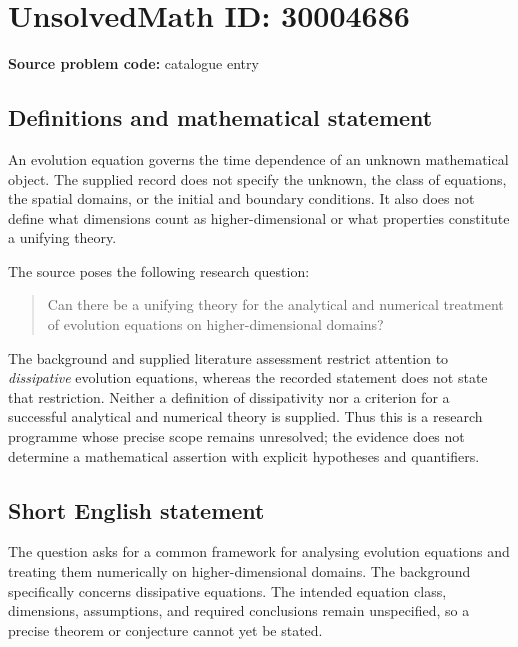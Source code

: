 \documentclass[11pt]{article}
\begin{document}
\section*{UnsolvedMath ID: 30004686}
\textbf{Source problem code:} catalogue entry
\subsection{Definitions and mathematical statement}
An evolution equation governs the time dependence of an unknown mathematical object. The supplied record does not specify the unknown, the class of equations, the spatial domains, or the initial and boundary conditions. It also does not define what dimensions count as higher-dimensional or what properties constitute a unifying theory.

The source poses the following research question:
\begin{quote}
Can there be a unifying theory for the analytical and numerical treatment of evolution equations on higher-dimensional domains?
\end{quote}
The background and supplied literature assessment restrict attention to \emph{dissipative} evolution equations, whereas the recorded statement does not state that restriction. Neither a definition of dissipativity nor a criterion for a successful analytical and numerical theory is supplied. Thus this is a research programme whose precise scope remains unresolved; the evidence does not determine a mathematical assertion with explicit hypotheses and quantifiers.
\subsection{Short English statement}
The question asks for a common framework for analysing evolution equations and treating them numerically on higher-dimensional domains. The background specifically concerns dissipative equations. The intended equation class, dimensions, assumptions, and required conclusions remain unspecified, so a precise theorem or conjecture cannot yet be stated.
\end{document}
